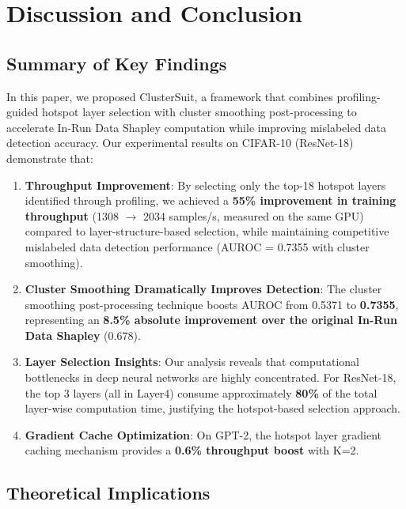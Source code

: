\documentclass[12pt,a4paper]{report}
\begin{document}
\chapter{Discussion and Conclusion}
\label{chap:conclusion}

\section{Summary of Key Findings}
\label{sec:findings}

In this paper, we proposed ClusterSuit, a framework that combines profiling-guided hotspot layer selection with cluster smoothing post-processing to accelerate In-Run Data Shapley computation while improving mislabeled data detection accuracy. Our experimental results on CIFAR-10 (ResNet-18) demonstrate that:

\begin{enumerate}
    \item \textbf{Throughput Improvement}: By selecting only the top-18 hotspot layers identified through profiling, we achieved a \textbf{55\% improvement in training throughput} (1308 $\rightarrow$ 2034 samples/s, measured on the same GPU) compared to layer-structure-based selection, while maintaining competitive mislabeled data detection performance (AUROC = 0.7355 with cluster smoothing).
    
    \item \textbf{Cluster Smoothing Dramatically Improves Detection}: The cluster smoothing post-processing technique boosts AUROC from 0.5371 to \textbf{0.7355}, representing an \textbf{8.5\% absolute improvement over the original In-Run Data Shapley} (0.678).
    
    \item \textbf{Layer Selection Insights}: Our analysis reveals that computational bottlenecks in deep neural networks are highly concentrated. For ResNet-18, the top 3 layers (all in Layer4) consume approximately \textbf{80\%} of the total layer-wise computation time, justifying the hotspot-based selection approach.
    
    \item \textbf{Gradient Cache Optimization}: On GPT-2, the hotspot layer gradient caching mechanism provides a \textbf{0.6\% throughput boost} with K=2.
\end{enumerate}

\section{Theoretical Implications}
\label{sec:implications}
\end{document}
